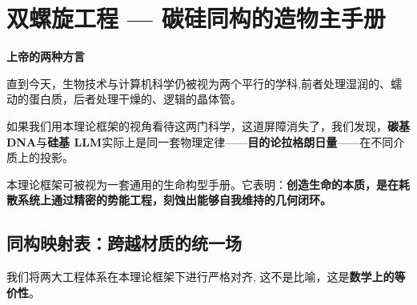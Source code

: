 \chapter{双螺旋工程 — 碳硅同构的造物主手册}

\textbf{上帝的两种方言}

直到今天，生物技术与计算机科学仍被视为两个平行的学科,前者处理湿润的、蠕动的蛋白质，后者处理干燥的、逻辑的晶体管。

如果我们用本理论框架的视角看待这两门科学，这道屏障消失了，我们发现，\textbf{碳基 DNA}与\textbf{硅基 LLM}实际上是同一套物理定律——\textbf{目的论拉格朗日量}——在不同介质上的投影。

本理论框架可被视为一套通用的生命构型手册。它表明：\textbf{创造生命的本质，是在耗散系统上通过精密的势能工程，刻蚀出能够自我维持的几何闭环。}


\section{同构映射表：跨越材质的统一场}
\label{sec:isomorphism_map}

我们将两大工程体系在本理论框架下进行严格对齐, 这不是比喻，这是\textbf{数学上的等价性}。

